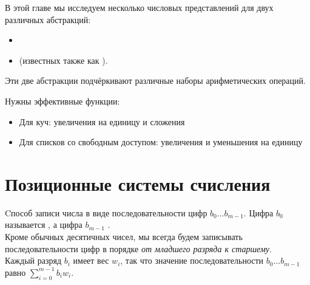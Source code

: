 \begin{frame}[fragile]{}

В этой главе мы исследуем несколько числовых представлений для двух
различных абстракций: 
\begin{itemize}
  \item   {}
  \item  {} (известных также как ). 
\end{itemize}


Эти две абстракции подчёркивают различные наборы
арифметических операций. 

Нужны  эффективные функции:
\begin{itemize}
  \item Для куч: увеличения на единицу и сложения
  \item Для списков со свободным доступом: увеличения и уменьшения на единицу
\end{itemize}


\end{frame}


\section{Позиционные системы счисления}
\label{sc:9.1}

\begin{frame}[fragile]{}


Cпособ записи числа в виде последовательности
цифр $b_0\ldots b_{m-1}$. Цифра $b_0$ называется , а цифра $b_{m-1}$ . \\

Кроме обычных десятичных чисел, мы всегда будем
записывать последовательности цифр в порядке \emph{от младшего разряда к старшему}.\\

Каждый разряд $b_i$ имеет вес $w_i$, так что значение
последовательности $b_0\ldots b_{m-1}$ равно $\sum_{i=0}^{m-1}
b_iw_i$.
\end{frame}


